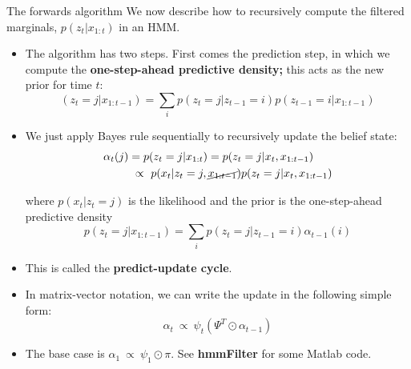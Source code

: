 \documentclass[10pt,mathserif]{beamer}
\begin{document}
\begin{frame}{The forwards algorithm}
We now describe how to recursively compute the filtered marginals, $p(z_t|x_{1:t})$ in an HMM. 

\begin{itemize}
    \item The algorithm has two steps. First comes the prediction step, in which we compute the \textbf{one-step-ahead predictive density;} this acts as the new prior for time $t$:
    \begin{equation}
        (z_t = j|x_{1:t-1}) = \sum_i p(z_t = j |z_{t-1} = i)p(z_{t-1} = i|x_{1:t-1})
    \end{equation}
    
    \item We just apply Bayes rule sequentially to recursively update the belief state:
    \begin{equation}
        \begin{split}
            \alpha_t(j) & = p(z_t = j|x_{1:t}) = p(z_t = j|x_t,x_{1:t-1})\\
            & \ \propto \ p(x_t|z_t = j, \cancel{x_{1:t-1}})p(z_t = j|x_t,x_{1:t-1})
        \end{split}
    \end{equation}
    
    where $p(x_t|z_t = j)$ is the likelihood and the prior is the one-step-ahead predictive density
    \begin{equation}
        p(z_t = j|x_{1:t-1}) = \sum_i p(z_t=j|z_{t-1}=i)\alpha_{t-1}(i)
    \end{equation}
    
    \item This is called the \textbf{predict-update cycle}.
    \item In matrix-vector notation, we can write the update in the following simple form:
    \begin{equation}
        \alpha_t \ \propto \ \psi_t (\Psi^T \odot \alpha_{t-1})
    \end{equation}
    
    \item The base case is $\alpha_1 \ \propto \ \psi_1 \odot \pi$.  See \textbf{hmmFilter} for some Matlab code.
\end{itemize}
\end{frame}
\end{document}
